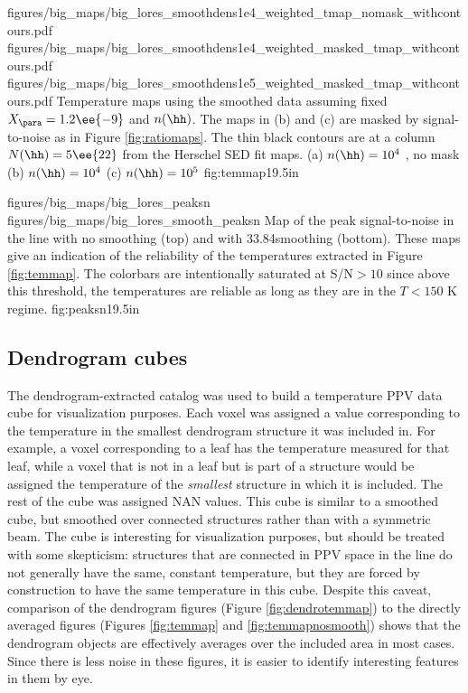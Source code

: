 \RotFigureThreeAA
{figures/big_maps/big_lores_smoothdens1e4_weighted_tmap_nomask_withcontours.pdf}
{figures/big_maps/big_lores_smoothdens1e4_weighted_masked_tmap_withcontours.pdf}
{figures/big_maps/big_lores_smoothdens1e5_weighted_masked_tmap_withcontours.pdf}
{Temperature maps using the smoothed data assuming fixed $X_{\para}=1.2\ee{-9}$
and $n(\hh)$.  The maps in (b) and (c) are masked by signal-to-noise as in Figure
\ref{fig:ratiomaps}.  The thin black contours are at a column $N(\hh)=5\ee{22}$
\percc from the Herschel SED fit maps.
(a) $n(\hh) = 10^4$ \percc, no mask
(b) $n(\hh) = 10^4$ \percc
(c) $n(\hh) = 10^5$ \percc
}
{fig:temmap}{1}{9.5in}


\RotFigureTwoAA
{figures/big_maps/big_lores_peaksn}
{figures/big_maps/big_lores_smooth_peaksn}
{Map of the peak signal-to-noise in the \para \threeohthree line with no
smoothing (top) and with 33.84\arcsec smoothing (bottom).  
These maps give an indication of the reliability of the temperatures extracted
in Figure \ref{fig:temmap}.  The colorbars are intentionally saturated at
S/N$>10$ since above this threshold, the temperatures are reliable as long as
they are in the $T<150$ K regime.
}
{fig:peaksn}{1}{9.5in}

\subsection{Dendrogram cubes}

The dendrogram-extracted catalog was used to build a temperature PPV data cube
for visualization purposes.  Each voxel was assigned a value corresponding to
the temperature in the smallest dendrogram structure it was included in.  For
example, a voxel corresponding to a leaf has the temperature measured for that
leaf, while a voxel that is not in a leaf but is part of a structure would be
assigned the temperature of the \emph{smallest} structure in which it is
included.  The rest of the
cube was assigned NAN values.  This cube is similar to a smoothed cube, but
smoothed over connected structures rather than with a symmetric beam.  The cube
is interesting for visualization purposes, but should be treated with some
skepticism: structures that are connected in PPV space in the \threeohthree
line do not generally have the same, constant temperature, but they are forced
by construction to have the same temperature in this cube.  Despite this
caveat, comparison of the dendrogram figures (Figure \ref{fig:dendrotemmap}) to
the directly averaged figures (Figures \ref{fig:temmap} and
\ref{fig:temmapnosmooth}) shows that the dendrogram objects are effectively
averages over the included area in most cases.  Since there is less noise in
these figures, it is easier to identify interesting features in them by eye.




